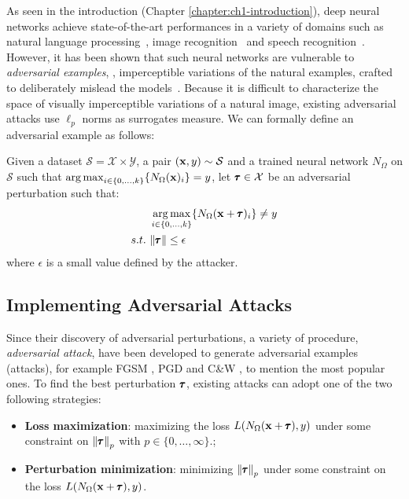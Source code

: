 As seen in the introduction (Chapter \ref{chapter:ch1-introduction}), deep neural networks achieve state-of-the-art performances in a variety of domains such as natural language processing~\cite{radford2018Language}, image recognition~\cite{he2016deep} and speech recognition~\cite{hinton2012deep}.
However, it has been shown that such neural networks are vulnerable to \emph{adversarial examples}, \ie, imperceptible variations of the natural examples, crafted to deliberately mislead the models~\cite{globerson2006nightmare,biggio2013evasion,szegedy2013intriguing}.
Because it is difficult to characterize the space of visually imperceptible variations of a natural image, existing adversarial attacks use $\ell_p$ norms as surrogates measure.
We can formally define an adversarial example as follows:
\begin{definition}
  Given a dataset $\mathcal{S} = \mathcal{X} \times \mathcal{Y}$, a pair $(\mathbf{x}, y) \sim \mathcal{S}$ and a trained neural network $N_\Omega$ on $\mathcal{S}$ such that $\operatorname*{arg\,max}_{i \in \{0, \dots, k\}} \{ N_\Omega(\mathbf{x})_i \} = y$, let $\pmb{\tau} \in \mathcal{X}$ be an adversarial perturbation such that:
  \begin{align}
    &\operatorname*{arg\,max}_{i \in \{0, \dots, k\}} \{ N_{\Omega} (\mathbf{x} + \pmb{\tau})_i \} \neq y \\
    s.t.\ &\norm{\pmb{\tau}} \leq \epsilon \notag
  \end{align}
  where $\epsilon$ is a small value defined by the attacker. 
\end{definition}

\subsection{Implementing Adversarial Attacks}
\label{subsection:ch2-adversarial_attacks}

\noindent
Since their discovery of adversarial perturbations, a variety of procedure, \aka \emph{adversarial attack}, have been developed to generate adversarial examples (\aka attacks), for example FGSM \cite{goodfellow2014explaining}, PGD \cite{madry2018towards} and C\&W \cite{carlini2017towards}, to mention the most popular ones.
To find the best perturbation $\pmb{\tau}$, existing attacks can adopt one of the two following strategies:
\begin{itemize}
  \item \textbf{Loss maximization}: maximizing the loss $L(N_\Omega(\mathbf{x} + \pmb{\tau}), y)$ under some constraint on $\norm{\pmb{\tau}}_p$ with $p \in \{0, \dots, \infty\}$.;
  \item \textbf{Perturbation minimization}: minimizing $\norm{\pmb{\tau}}_p$ under some constraint on the loss $L(N_\Omega(\mathbf{x} + \pmb{\tau}), y)$.
\end{itemize}

